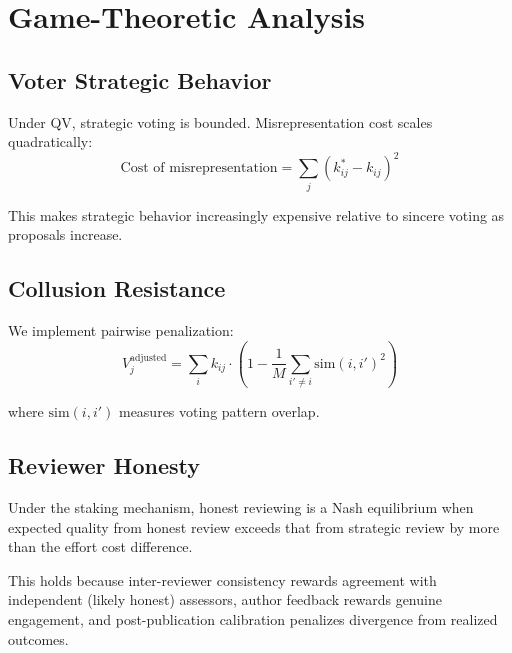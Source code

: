 \section{Game-Theoretic Analysis}

\label{sec:game_theory}

\subsection{Voter Strategic Behavior}

Under QV, strategic voting is bounded. Misrepresentation cost scales
quadratically:
\begin{equation}
  \text{Cost of misrepresentation} = \sum_j (k_{ij}^* - k_{ij})^2
\end{equation}

This makes strategic behavior increasingly expensive relative to sincere
voting as proposals increase.

\subsection{Collusion Resistance}

We implement pairwise penalization:
\begin{equation}
  V_j^{\text{adjusted}} = \sum_i k_{ij} \cdot \left(1 -
  \frac{1}{M} \sum_{i' \neq i} \text{sim}(i, i')^2\right)
\end{equation}

where $\text{sim}(i, i')$ measures voting pattern overlap.

\subsection{Reviewer Honesty}

\begin{proposition}
Under the staking mechanism, honest reviewing is a Nash equilibrium when
expected quality from honest review exceeds that from strategic review
by more than the effort cost difference.
\end{proposition}

This holds because inter-reviewer consistency rewards agreement with
independent (likely honest) assessors, author feedback rewards genuine
engagement, and post-publication calibration penalizes divergence from
realized outcomes.


